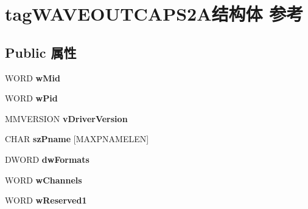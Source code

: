 \hypertarget{structtag_w_a_v_e_o_u_t_c_a_p_s2_a}{}\section{tag\+W\+A\+V\+E\+O\+U\+T\+C\+A\+P\+S2\+A结构体 参考}
\label{structtag_w_a_v_e_o_u_t_c_a_p_s2_a}
\subsection*{Public 属性}
\begin{DoxyCompactItemize}
\item 
\mbox{\label{structtag_w_a_v_e_o_u_t_c_a_p_s2_a_a0ab367ad02ec6d207f770acdba9d6de4}} 
W\+O\+RD {\bfseries w\+Mid}
\item 
\mbox{\label{structtag_w_a_v_e_o_u_t_c_a_p_s2_a_af2829f5eebd3d428d96d1a581935a966}} 
W\+O\+RD {\bfseries w\+Pid}
\item 
\mbox{\label{structtag_w_a_v_e_o_u_t_c_a_p_s2_a_adccd94d1c12d3e38da501289a9ec1ed4}} 
M\+M\+V\+E\+R\+S\+I\+ON {\bfseries v\+Driver\+Version}
\item 
\mbox{\label{structtag_w_a_v_e_o_u_t_c_a_p_s2_a_a83fed03650ae08e4d447eaa9b7b20005}} 
C\+H\+AR {\bfseries sz\+Pname} \mbox{[}M\+A\+X\+P\+N\+A\+M\+E\+L\+EN\mbox{]}
\item 
\mbox{\label{structtag_w_a_v_e_o_u_t_c_a_p_s2_a_acc65dac1f2a702e7e91ed37b229a664b}} 
D\+W\+O\+RD {\bfseries dw\+Formats}
\item 
\mbox{\label{structtag_w_a_v_e_o_u_t_c_a_p_s2_a_a3a1a320652d9d9b46efed5b641baf6fe}} 
W\+O\+RD {\bfseries w\+Channels}
\item 
\mbox{\label{structtag_w_a_v_e_o_u_t_c_a_p_s2_a_a783b65a3ce6525553d0e0f03a49abaec}} 
W\+O\+RD {\bfseries w\+Reserved1}
\item 
\mbox{\label{structtag_w_a_v_e_o_u_t_c_a_p_s2_a_a876a69c31ef91e8637d5060c15bf4091}} 

\end{DoxyCompactItemize}
